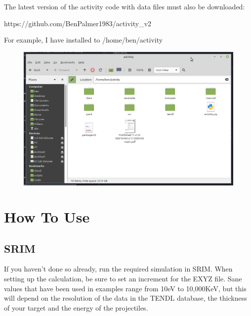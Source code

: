 \documentclass[12pt,twoside]{manual}
\begin{document}
The latest version of the activity code with data files must also be downloaded:

https://github.com/BenPalmer1983/activity\_v2

For example, I have installed to /home/ben/activity

\FloatBarrier

\begin{figure}[h]
  \begin{center}
    \includegraphics[scale=0.50]{img/installdir}
  \end{center}
\end{figure}



\FloatBarrier


\chapter{How To Use}


\section{SRIM}

If you haven't done so already, run the required simulation in SRIM.  When setting up the calculation, be sure to set an increment for the EXYZ file.  Sane values that have been used in examples range from 10eV to 10,000KeV, but this will depend on the resolution of the data in the TENDL database, the thickness of your target and the energy of the projectiles.
\end{document}
